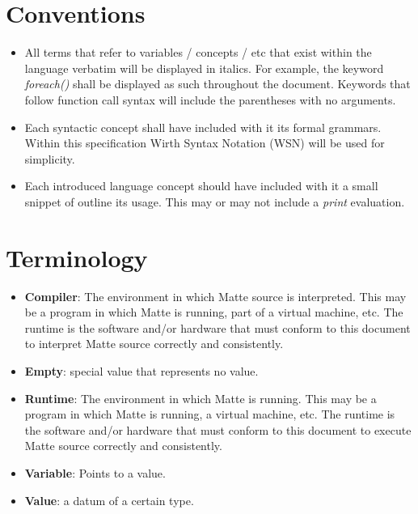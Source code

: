 \documentclass[12pt,letterpaper]{report}
\begin{document}
\section{Conventions}
\begin{itemize}
  \item All terms that refer to variables / concepts / etc that exist within the language verbatim will 
  be displayed in italics. For example, the keyword \textit{foreach()} shall be displayed as such 
  throughout the document. Keywords that follow function call syntax will include the parentheses with 
  no arguments.
  
  \item Each syntactic concept shall have included with it its formal grammars. Within this specification 
  Wirth Syntax Notation (WSN) will be used for simplicity.

  \item Each introduced language concept should have included with it a small snippet of outline its usage. This 
  may or may not include a \textit{print} evaluation.

  

\end{itemize}
\section{Terminology}

\begin{itemize}
\item \textbf{Compiler}: The environment in which Matte source is interpreted. This may be a program in which Matte is running, part of a virtual machine, etc. The runtime is the software and/or hardware that must conform to this document to interpret Matte source correctly and consistently.

\item \textbf{Empty}: special value that represents no value. 

\item \textbf{Runtime}: The environment in which Matte is running. This may be a program in which Matte is running, a virtual machine, etc. The runtime is the software and/or hardware that must conform to this document to execute Matte source correctly and consistently.

\item \textbf{Variable}: Points to a value.

\item \textbf{Value}: a datum of a certain type.
\end{itemize}
\end{document}
